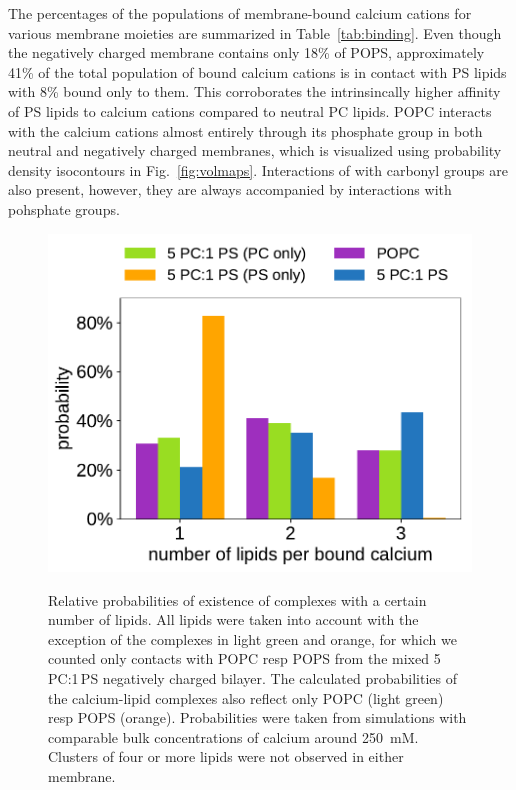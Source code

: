 The percentages of the populations of membrane-bound calcium cations for various membrane moieties 
are summarized in Table~\ref{tab:binding}.
Even though the negatively charged membrane contains only 18\% of POPS, 
approximately 41\% of the total population of bound calcium cations is in contact with PS lipids
with 8\% bound only to them. 
This corroborates the intrinsincally higher affinity of PS lipids to calcium cations compared to neutral PC lipids. 
POPC interacts with the calcium cations almost entirely through its phosphate group 
in both neutral and negatively charged membranes, 
which is visualized using probability density isocontours in Fig.~\ref{fig:volmaps}.
Interactions of  with carbonyl groups are also present, 
however, they are always accompanied by interactions with pohsphate groups. 



\begin{figure}[tb!] 
  \centering 
  \includegraphics[width=\figwidth]{../img/stoichiometry_CaCl2_comparison_Ecc-lipids_PC-vs-PCPS.pdf} \\ 
  \caption{\label{fig:cacl_complexes} 
      Relative probabilities of existence of  complexes 
      with a certain number of lipids.  
      All lipids were taken into account with the exception of the complexes in light green and orange, 
      for which we counted only contacts with POPC resp POPS from the mixed 5\,PC:1\,PS negatively charged bilayer. 
      The calculated probabilities of the calcium-lipid complexes also reflect only POPC (light green) resp POPS (orange). 
      Probabilities were taken from simulations with comparable bulk concentrations of calcium around 250~mM. 
      Clusters of four or more lipids were not observed in either membrane. 
  } 
\end{figure} 




